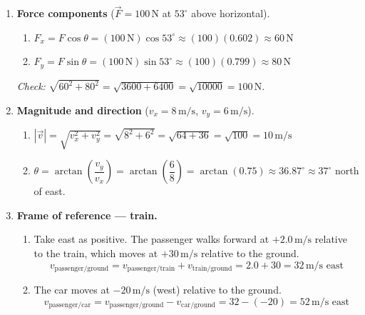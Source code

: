 \documentclass[12pt, twoside]{article}
\begin{document}
\begin{enumerate}
\newpage

\item \textbf{Force components} ($\vec{F} = 100\,\text{N}$ at $53^\circ$ above horizontal).

\begin{enumerate}
\item $F_x = F\cos\theta = (100\,\text{N})\cos 53^\circ \approx (100)(0.602) \approx \boxed{60\,\text{N}}$

\item $F_y = F\sin\theta = (100\,\text{N})\sin 53^\circ \approx (100)(0.799) \approx \boxed{80\,\text{N}}$
\end{enumerate}

\emph{Check:} $\sqrt{60^2 + 80^2} = \sqrt{3600 + 6400} = \sqrt{10000} = 100\,\text{N}.$ \checkmark

\vspace{0.8cm}

\item \textbf{Magnitude and direction} ($v_x = 8\,\text{m/s}$, $v_y = 6\,\text{m/s}$).

\begin{enumerate}
\item $|\vec{v}| = \sqrt{v_x^2 + v_y^2} = \sqrt{8^2 + 6^2} = \sqrt{64 + 36} = \sqrt{100} = \boxed{10\,\text{m/s}}$

\item $\theta = \arctan\!\left(\dfrac{v_y}{v_x}\right) = \arctan\!\left(\dfrac{6}{8}\right) = \arctan(0.75) \approx 36.87^\circ \approx \boxed{37^\circ}$ north of east.
\end{enumerate}

\vspace{0.8cm}

\item \textbf{Frame of reference --- train.}

\begin{enumerate}
\item Take east as positive. The passenger walks forward at $+2.0\,\text{m/s}$ relative to the train, which moves at $+30\,\text{m/s}$ relative to the ground.
\[
v_{\text{passenger/ground}} = v_{\text{passenger/train}} + v_{\text{train/ground}} = 2.0 + 30 = \boxed{32\,\text{m/s east}}
\]

\item The car moves at $-20\,\text{m/s}$ (west) relative to the ground.
\[
v_{\text{passenger/car}} = v_{\text{passenger/ground}} - v_{\text{car/ground}} = 32 - (-20) = \boxed{52\,\text{m/s east}}
\]
\end{enumerate}


\end{enumerate}
\end{document}
